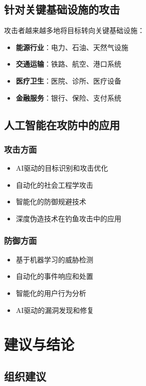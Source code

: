 \documentclass[12pt,a4paper]{article}
\begin{document}
\subsection{针对关键基础设施的攻击}

攻击者越来越多地将目标转向关键基础设施：

\begin{itemize}
    \item \textbf{能源行业}：电力、石油、天然气设施
    \item \textbf{交通运输}：铁路、航空、港口系统
    \item \textbf{医疗卫生}：医院、诊所、医疗设备
    \item \textbf{金融服务}：银行、保险、支付系统
\end{itemize}

\subsection{人工智能在攻防中的应用}

\subsubsection{攻击方面}
\begin{itemize}
    \item AI驱动的目标识别和攻击优化
    \item 自动化的社会工程学攻击
    \item 智能化的防御规避技术
    \item 深度伪造技术在钓鱼攻击中的应用
\end{itemize}

\subsubsection{防御方面}
\begin{itemize}
    \item 基于机器学习的威胁检测
    \item 自动化的事件响应和处置
    \item 智能化的用户行为分析
    \item AI驱动的漏洞发现和修复
\end{itemize}

\section{建议与结论}

\subsection{组织建议}
\end{document}
